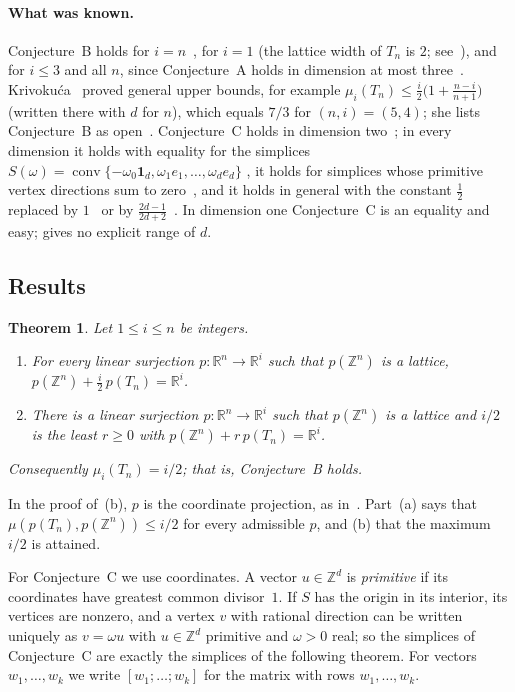 \documentclass[11pt]{article}
\newtheorem{theorem}{Theorem}
\theoremstyle{definition}
\theoremstyle{remark}
\newcommand{\R}{\mathbb R}
\newcommand{\Z}{\mathbb Z}
\newcommand{\one}{\mathbf 1}
\newcommand{\conv}{\operatorname{conv}}
\begin{document}
\paragraph{What was known.} Conjecture~B holds for $i=n$~\cite[Prop.~4.8]{gms},
for $i=1$ (the lattice width of $T_n$ is $2$; see~\cite[p.~8]{kr}), and for
$i\le3$ and all $n$, since Conjecture~A holds in dimension at most
three~\cite[Theorem~1.3]{css}. Krivokuća~\cite{kr} proved general upper bounds,
for example $\mu_i(T_n)\le\frac i2\bigl(1+\frac{n-i}{n+1}\bigr)$
\cite[Corollary~5.9]{kr} (written there with $d$ for $n$), which equals $7/3$
for $(n,i)=(5,4)$; she lists Conjecture~B as open~\cite[Conjecture~4.2]{kr}.
Conjecture~C holds in dimension two~\cite[Theorem~4.9 and Corollary~4.11]{css};
in every dimension it holds with equality for the simplices
$S(\omega)=\conv\{-\omega_0\one_d,\omega_1e_1,\dots,\omega_de_d\}$
\cite[Theorem~1.4]{css}, it holds for simplices whose primitive vertex
directions sum to zero~\cite[Corollary~5.1]{css}, and it holds in general with the constant $\frac12$
replaced by $1$~\cite[Proposition~4.4]{css} or by
$\frac{2d-1}{2d+2}$~\cite[Remark~4.5]{css}. In dimension one Conjecture~C is
an equality and easy; \cite{css} gives no explicit range of $d$.

\subsection{Results}

\begin{theorem}\label{thm:B}
Let $1\le i\le n$ be integers.
\begin{enumerate}
\item[\textup{(a)}] For every linear surjection $p\colon\R^n\to\R^i$ such that
$p(\Z^n)$ is a lattice, $p(\Z^n)+\frac i2\,p(T_n)=\R^i$.
\item[\textup{(b)}] There is a linear surjection $p\colon\R^n\to\R^i$ such that
$p(\Z^n)$ is a lattice and $i/2$ is the least $r\ge0$ with
$p(\Z^n)+r\,p(T_n)=\R^i$.
\end{enumerate}
Consequently $\mu_i(T_n)=i/2$; that is, Conjecture~B holds.
\end{theorem}

\noindent In the proof of~(b), $p$ is the coordinate projection, as
in~\cite{gms}. Part~(a) says that $\mu(p(T_n),p(\Z^n))\le i/2$ for every
admissible $p$, and (b) that the maximum $i/2$ is attained.

For Conjecture~C we use coordinates. A vector $u\in\Z^d$ is \emph{primitive}
if its coordinates have greatest common divisor~$1$. If $S$ has the origin in
its interior, its vertices are nonzero, and a vertex $v$ with rational
direction can be written uniquely as $v=\omega u$ with $u\in\Z^d$ primitive
and $\omega>0$ real; so the simplices of Conjecture~C are exactly the
simplices of the following theorem. For vectors $w_1,\dots,w_k$ we write
$[w_1;\dots;w_k]$ for the matrix with rows $w_1,\dots,w_k$.
\end{document}
